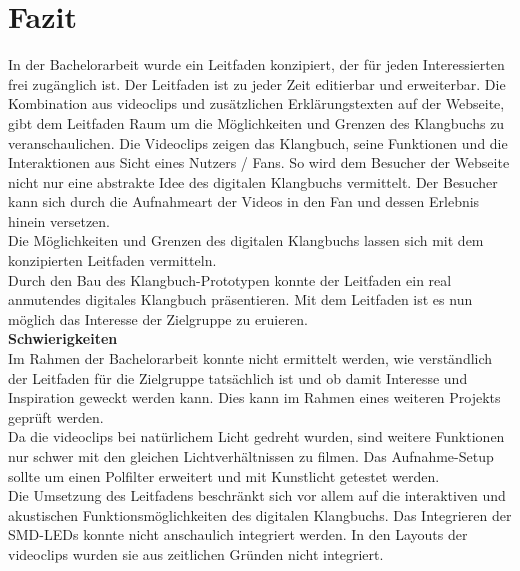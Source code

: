 

\chapter{Fazit}

In der Bachelorarbeit wurde ein Leitfaden konzipiert, der für jeden Interessierten frei zugänglich ist. Der Leitfaden ist zu jeder Zeit editierbar und erweiterbar. Die Kombination aus \gls{videoclip}s und zusätzlichen Erklärungstexten auf der Webseite, gibt dem Leitfaden Raum um die Möglichkeiten und Grenzen des Klangbuchs zu veranschaulichen. Die Videoclips zeigen das Klangbuch, seine Funktionen und die Interaktionen aus Sicht eines Nutzers / Fans. So wird dem Besucher der Webseite nicht nur eine abstrakte Idee des digitalen Klangbuchs vermittelt. Der Besucher kann sich durch die Aufnahmeart der Videos in den Fan und dessen Erlebnis hinein versetzen.\\Die Möglichkeiten und Grenzen des digitalen Klangbuchs lassen sich mit dem konzipierten Leitfaden vermitteln.\\

Durch den Bau des Klangbuch-Prototypen konnte der Leitfaden ein real anmutendes digitales Klangbuch präsentieren. Mit dem Leitfaden ist es nun möglich das Interesse der Zielgruppe zu eruieren.\\

\textbf{Schwierigkeiten}\\
Im Rahmen der Bachelorarbeit konnte nicht ermittelt werden, wie verständlich der Leitfaden für die Zielgruppe tatsächlich ist und ob damit Interesse und Inspiration geweckt werden kann. Dies kann im Rahmen eines weiteren Projekts geprüft werden.\\

Da die \gls{videoclip}s bei natürlichem Licht gedreht wurden, sind weitere Funktionen nur schwer mit den gleichen Lichtverhältnissen zu filmen. Das Aufnahme-Setup sollte um einen Polfilter erweitert und mit Kunstlicht getestet werden.\\

Die Umsetzung des Leitfadens beschränkt sich vor allem auf die interaktiven und akustischen Funktionsmöglichkeiten des digitalen Klangbuchs. Das Integrieren der SMD-LEDs konnte nicht anschaulich integriert werden. In den Layouts der \gls{videoclip}s wurden sie aus zeitlichen Gründen nicht integriert.


